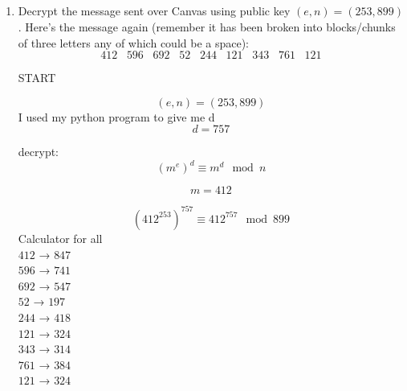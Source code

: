\documentclass[10pt, AMS Euler]{article}
\begin{document}
	
	\\
    \\
	
	\noindent \underline{\hspace{2in}}\\
	
	\\
	
	\begin{enumerate}
		\newpage
		\item Decrypt the message sent over Canvas using public key $(e, n) = (253,899)$.  Here's the message again (remember it has been broken into blocks/chunks of three letters any of which could be a space):\\
		$$ 412 \;\;\; 596 \;\;\; 692 \;\;\; 52 \;\;\; 244 \;\;\; 121 \;\;\; 343 \;\;\; 761 \;\;\; 121$$

        START

        $$(e, n) = (253,899)$$
        I used my python program to give me d
        $$ d = 757 $$

        decrypt:
        $$ (m^e)^d \equiv m^d \mod n $$
        
        $$ m = 412 $$

        $$ (412^{253})^{757} \equiv 412^{757} \mod 899 $$
        Calculator for all \\
        $412$ → $847$ \\
        $596$ → $741$ \\
        $692$ → $547$ \\
        $52$ → $197$ \\    
        $244$ → $418$ \\        
        $121$ → $324$ \\
        $343$ → $314$ \\
        $761$ → $384$ \\
        $121$ → $324$ \\

        \newpage


\end{enumerate}
\end{document}
